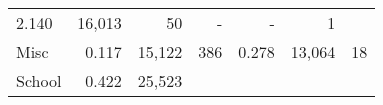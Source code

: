 \documentclass[]{book}
\theoremstyle{definition}
\theoremstyle{definition}
\theoremstyle{definition}
\theoremstyle{remark}
\begin{document}
\begin{longtable}[]{@{}lrrrrrr@{}}
\begin{minipage}[t]{0.12\columnwidth}
2.140\strut
\end{minipage} & \begin{minipage}[t]{0.11\columnwidth}\raggedleft\strut
16,013\strut
\end{minipage} & \begin{minipage}[t]{0.11\columnwidth}\raggedleft\strut
50\strut
\end{minipage} & \begin{minipage}[t]{0.12\columnwidth}\raggedleft\strut
-\strut
\end{minipage} & \begin{minipage}[t]{0.11\columnwidth}\raggedleft\strut
-\strut
\end{minipage} & \begin{minipage}[t]{0.11\columnwidth}\raggedleft\strut
1\strut
\end{minipage}\tabularnewline
\begin{minipage}[t]{0.10\columnwidth}\raggedright\strut
Misc\strut
\end{minipage} & \begin{minipage}[t]{0.12\columnwidth}\raggedleft\strut
0.117\strut
\end{minipage} & \begin{minipage}[t]{0.11\columnwidth}\raggedleft\strut
15,122\strut
\end{minipage} & \begin{minipage}[t]{0.11\columnwidth}\raggedleft\strut
386\strut
\end{minipage} & \begin{minipage}[t]{0.12\columnwidth}\raggedleft\strut
0.278\strut
\end{minipage} & \begin{minipage}[t]{0.11\columnwidth}\raggedleft\strut
13,064\strut
\end{minipage} & \begin{minipage}[t]{0.11\columnwidth}\raggedleft\strut
18\strut
\end{minipage}\tabularnewline
\begin{minipage}[t]{0.10\columnwidth}\raggedright\strut
School\strut
\end{minipage} & \begin{minipage}[t]{0.12\columnwidth}\raggedleft\strut
0.422\strut
\end{minipage} & \begin{minipage}[t]{0.11\columnwidth}\raggedleft\strut
25,523\strut
\end{minipage} & \begin{minipage}[t]{0.11\columnwidth}\raggedleft\strut

\end{minipage}
\end{longtable}
\end{document}

